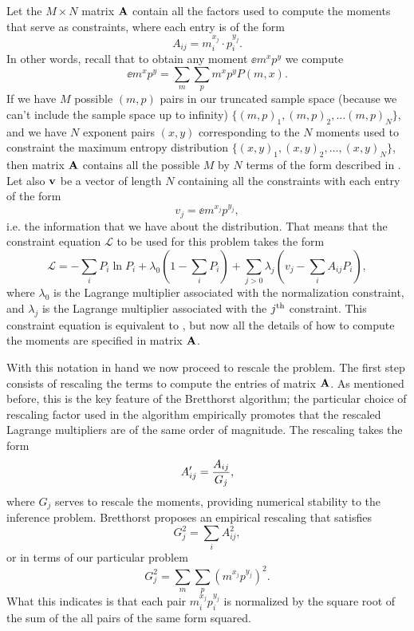 Let the $M \times N$ matrix $\mathbf{A}$ contain all the factors used to compute
the moments that serve as constraints, where each entry is of the form
\begin{equation}
  A_{ij} = m_i^{x_j} \cdot p_i^{y_j}.
  \label{seq_maxent_rules}
\end{equation}
In other words, recall that to obtain any moment $\ee{m^x p^y}$ we compute
\begin{equation}
  \ee{m^x p^y} = \sum_m \sum_p m^x p^y P(m, x).
\end{equation}
If we have $M$ possible $(m, p)$ pairs in our truncated sample space (because
we can't include the sample space up to infinity) $\{(m, p)_1, (m, p)_2, \ldots
(m, p)_N \}$, and we have $N$ exponent pairs $(x, y)$ corresponding to the $N$
moments used to constraint the maximum entropy distribution $\{(x, y)_1, (x,
y)_2, \ldots, (x, y)_N \}$, then matrix $\mathbf{A}$ contains all the possible $M$
by $N$ terms of the form described in . Let also
$\mathbf{v}$ be a vector of length $N$ containing all the constraints with each
entry of the form
\begin{equation}
  v_j = \ee{m^{x_j} p^{y_j}},
\end{equation}
i.e. the information that we have about the distribution. That means that the
constraint equation $\mathcal{L}$ to be used for this problem takes the form
\begin{equation}
  \mathcal{L} = -\sum_i P_i \ln P_i + \lambda_0 \left( 1 - \sum_i P_i \right)
  + \sum_{j>0} \lambda_j \left( v_j - \sum_i A_{ij} P_i \right),
\end{equation}
where $\lambda_0$ is the Lagrange multiplier associated with the normalization
constraint, and $\lambda_j$ is the Lagrange multiplier associated with the
$j^\text{th}$ constraint. This constraint equation is equivalent to
, but now all the details of how to compute the moments
are specified in matrix $\mathbf{A}$.

With this notation in hand we now proceed to rescale the problem. The first
step consists of rescaling the terms to compute the entries of matrix $\mathbf{A}$.
As mentioned before, this is the key feature of the Bretthorst algorithm; the
particular choice of rescaling factor used in the algorithm empirically
promotes that the rescaled Lagrange multipliers are of the same order of
magnitude. The rescaling takes the form
\begin{equation}
  A_{ij}' = {A_{ij} \over G_j},
\end{equation}
where $G_j$ serves to rescale the moments, providing numerical stability to the
inference problem. Bretthorst proposes an empirical rescaling that satisfies
\begin{equation}
G_j^2 = \sum_i A_{ij}^2,
\end{equation}
or in terms of our particular problem
\begin{equation}
G_j^2 = \sum_m \sum_p \left( m^{x_j} p^{y_j} \right)^2.
\end{equation}
What this indicates is that each pair $m_i^{x_j} p_i^{y_j}$ is normalized by
the square root of the sum of the all pairs of the same form squared.

